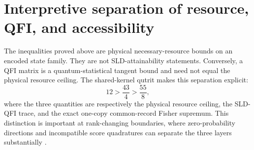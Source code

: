 \documentclass[aps,pra,preprint,nofootinbib]{revtex4-2}
\begin{document}
\section{Interpretive separation of resource, QFI, and accessibility}
The inequalities proved above are physical necessary-resource bounds on an encoded state family. They are not SLD-attainability statements. Conversely, a QFI matrix is a quantum-statistical tangent bound and need not equal the physical resource ceiling. The shared-kernel qutrit makes this separation explicit:
\begin{equation}
12>\frac{43}{4}>\frac{55}{8},
\end{equation}
where the three quantities are respectively the physical resource ceiling, the SLD-QFI trace, and the exact one-copy common-record Fisher supremum. This distinction is important at rank-changing boundaries, where zero-probability directions and incompatible score quadratures can separate the three layers substantially \cite{Safranek2017,LiEtAl2016}.



\end{document}
